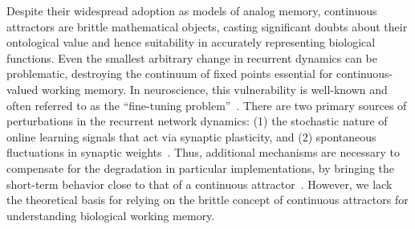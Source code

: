 \documentclass{article} %
\newcounter{ct}
\theoremstyle{definition}
\theoremstyle{remark}
\renewcommand{\cite}{\citep}
\begin{document}


Despite their widespread adoption as models of analog memory, continuous attractors are brittle mathematical objects, casting significant doubts about their ontological value and hence suitability in accurately representing biological functions.
Even the smallest arbitrary change in recurrent dynamics can be problematic, destroying the continuum of fixed points essential for continuous-valued working memory.
In neuroscience, this vulnerability is well-known and often referred to as the ``fine-tuning problem''~\cite{seung1996,Renart2003,Park2023a}.
There are two primary sources of perturbations in the recurrent network dynamics:
(1) the stochastic nature of online learning signals that act via synaptic plasticity, and
(2) spontaneous fluctuations in synaptic weights~\cite{Fusi2007-yg,shimizu2021}.
Thus, additional mechanisms are necessary to compensate for the degradation in particular implementations, by bringing the short-term behavior close to that of a continuous attractor~\cite{Lim2012,Lim2013,Boerlin2013,Koulakov2002,Renart2003,gu2022}.
However, we lack the theoretical basis for relying on the brittle concept of continuous attractors for understanding biological working memory.
\end{document}
